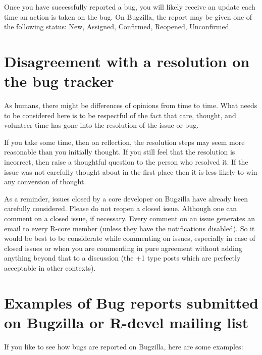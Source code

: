 \documentclass[
]{book}
\begin{document}
Once you have successfully reported a bug, you will likely receive an update each time an action is taken on the bug. On Bugzilla, the report may be given one of the following status: New, Assigned, Confirmed, Reopened, Unconfirmed.

\section{Disagreement with a resolution on the bug tracker}\label{disagreement-with-a-resolution-on-the-bug-tracker}

As humans, there might be differences of opinions from time to time. What needs to be considered here is to be respectful of the fact that care, thought, and volunteer time has gone into the resolution of the issue or bug.

If you take some time, then on reflection, the resolution steps may seem more reasonable than you initially thought. If you still feel that the resolution is incorrect, then raise a thoughtful question to the person who resolved it. If the issue was not carefully thought about in the first place then it is less likely to win any conversion of thought.

As a reminder, issues closed by a core developer on Bugzilla have already been carefully considered. Please do not reopen a closed issue. Although one can comment on a closed issue, if necessary. Every comment on an issue generates an email to every R-core member (unless they have the notifications disabled). So it would be best to be considerate while commenting on issues, especially in case of closed issues or when you are commenting in pure agreement without adding anything beyond that to a discussion (the +1 type posts which are perfectly acceptable in other contexts).

\section{Examples of Bug reports submitted on Bugzilla or R-devel mailing list}\label{examples-of-bug-reports-submitted-on-bugzilla-or-r-devel-mailing-list}

If you like to see how bugs are reported on Bugzilla, here are some examples:
\end{document}
